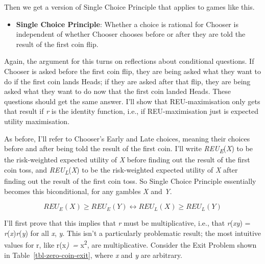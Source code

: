 \documentclass[
  12pt,
  letterpaper,
  DIV=11,
  numbers=noendperiod]{scrreprt}
\providecommand{\tightlist}{%
  \setlength{\itemsep}{0pt}\setlength{\parskip}{0pt}}\usepackage{longtable,booktabs,array}
\begin{document}
Then we get a version of Single Choice Principle that applies to games
like this.

\begin{itemize}
\tightlist
\item
  \textbf{Single Choice Principle}: Whether a choice is rational for
  Chooser is independent of whether Chooser chooses before or after they
  are told the result of the first coin flip.
\end{itemize}

Again, the argument for this turns on reflections about conditional
questions. If Chooser is asked before the first coin flip, they are
being asked what they want to do if the first coin lands Heads; if they
are asked after that flip, they are being asked what they want to do now
that the first coin landed Heads. These questions should get the same
answer. I'll show that REU-maximisation only gets that result if
\emph{r} is the identity function, i.e., if REU-maximisation just is
expected utility maximisation.

As before, I'll refer to Chooser's Early and Late choices, meaning their
choices before and after being told the result of the first coin. I'll
write \emph{REU\textsubscript{E}}(\emph{X}) to be the risk-weighted
expected utility of \emph{X} before finding out the result of the first
coin toss, and \emph{REU\textsubscript{L}}(\emph{X}) to be the
risk-weighted expected utility of \emph{X} after finding out the result
of the first coin toss. So Single Choice Principle essentially becomes
this biconditional, for any gambles \emph{X} and \emph{Y}.

\[
REU_E(X) \geq REU_E(Y) \leftrightarrow REU_L(X) \geq REU_L(Y)
\]

I'll first prove that this implies that \emph{r} must be multiplicative,
i.e., that \emph{r}(\emph{xy}) = \emph{r}(\emph{x})\emph{r}(\emph{y})
for all \emph{x}, \emph{y}. This isn't a particularly problematic
result; the most intuitive values for r, like r(x\emph{)~=}
x\textsuperscript{2}, are multiplicative. Consider the Exit Problem
shown in Table~\ref{tbl-zero-coin-exit}, where \emph{x} and \emph{y} are
arbitrary.
\end{document}
